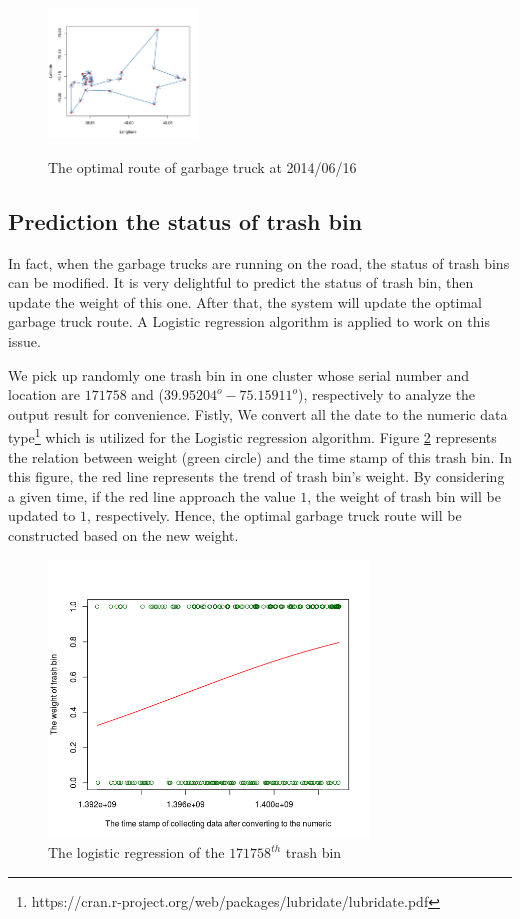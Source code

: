 \documentclass[conference,compsoc]{IEEEtran}
\begin{document}
\begin{figure}
	\begin{minipage}{3cm}
		\includegraphics[width=4cm]{Cluster5}
		
		\label{fig1b}
	\end{minipage}
	\caption{The optimal route of garbage truck at 2014/06/16}
	\label{fig5}
	
\end{figure}
\subsection{Prediction the status of trash bin} 

In fact, when the garbage trucks are running on the road, the status of trash bins can be modified. It is very delightful to predict the status of trash bin, then update the weight of this one. After that, the system will update the optimal garbage truck route. A Logistic regression algorithm is applied to work on this issue. 

We pick up randomly one trash bin in one cluster whose serial number and location are $171758$ and ($39.95204^o -75.15911^o$), respectively to analyze the output result for convenience. Fistly, We convert all the date to the numeric data type\footnote{https://cran.r-project.org/web/packages/lubridate/lubridate.pdf} which is utilized for the Logistic regression algorithm. Figure \ref{fig6} represents the relation between weight (green circle) and the time stamp of this trash bin. In this figure, the red line represents the trend of trash bin's weight. By considering a given time, if the red line approach the value $1$, the weight of trash bin will be updated to $1$, respectively. Hence, the optimal garbage truck route will be constructed based on the new weight.

  \begin{figure}
	\centering
	\includegraphics[width=8.5cm]{regression}
	\caption{The logistic regression of the $171758^{th}$ trash bin}
	\label{fig6}
\end{figure}
\end{document}
